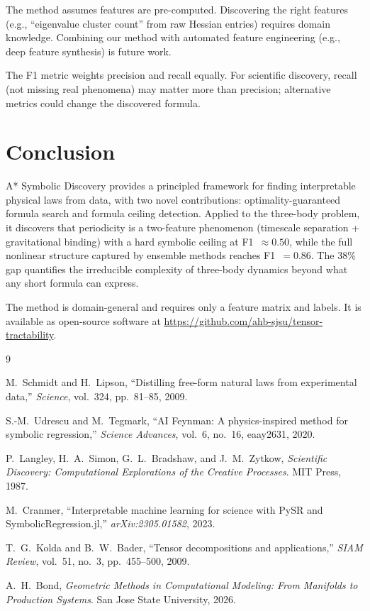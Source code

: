 \documentclass[11pt,a4paper]{article}
\begin{document}
The method assumes features are pre-computed. Discovering the right
features (e.g., ``eigenvalue cluster count'' from raw Hessian entries)
requires domain knowledge. Combining our method with automated
feature engineering (e.g., deep feature synthesis) is future work.

The F1 metric weights precision and recall equally. For scientific
discovery, recall (not missing real phenomena) may matter more than
precision; alternative metrics could change the discovered formula.

\section{Conclusion}

A* Symbolic Discovery provides a principled framework for finding
interpretable physical laws from data, with two novel contributions:
optimality-guaranteed formula search and formula ceiling detection.
Applied to the three-body problem, it discovers that periodicity is
a two-feature phenomenon (timescale separation + gravitational
binding) with a hard symbolic ceiling at F1~$\approx 0.50$, while
the full nonlinear structure captured by ensemble methods reaches
F1~$= 0.86$. The 38\% gap quantifies the irreducible complexity
of three-body dynamics beyond what any short formula can express.

The method is domain-general and requires only a feature matrix and
labels. It is available as open-source software at
\url{https://github.com/ahb-sjsu/tensor-tractability}.

\begin{thebibliography}{9}

M.~Schmidt and H.~Lipson, ``Distilling free-form natural laws from
experimental data,'' \emph{Science}, vol.~324, pp.~81--85, 2009.

S.-M.~Udrescu and M.~Tegmark, ``AI Feynman: A physics-inspired
method for symbolic regression,'' \emph{Science Advances}, vol.~6,
no.~16, eaay2631, 2020.

P.~Langley, H.~A.~Simon, G.~L.~Bradshaw, and J.~M.~Zytkow,
\emph{Scientific Discovery: Computational Explorations of the
Creative Processes}. MIT Press, 1987.

M.~Cranmer, ``Interpretable machine learning for science with PySR
and SymbolicRegression.jl,'' \emph{arXiv:2305.01582}, 2023.

T.~G.~Kolda and B.~W.~Bader, ``Tensor decompositions and
applications,'' \emph{SIAM Review}, vol.~51, no.~3, pp.~455--500,
2009.

A.~H.~Bond, \emph{Geometric Methods in Computational Modeling:
From Manifolds to Production Systems}. San Jose State University,
2026.

\end{thebibliography}
\end{document}
